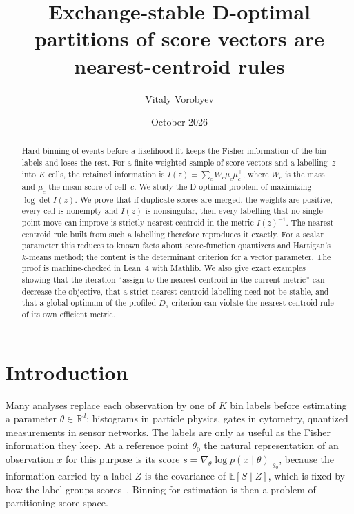 \documentclass[11pt]{amsart}
\title[Exchange-stable D-optimal binning of scores]{Exchange-stable D-optimal partitions of score
vectors are nearest-centroid rules}
\author{Vitaly Vorobyev}
\date{October 2026}
\theoremstyle{definition}
\theoremstyle{remark}
\newcommand{\R}{\mathbb{R}}
\newcommand{\T}{^{\top}}
\newcommand{\Ib}{I(z)}
\begin{document}
\begin{abstract}
Hard binning of events before a likelihood fit keeps the Fisher information of the bin labels
and loses the rest. For a finite weighted sample of score vectors and a labelling~$z$ into
$K$ cells, the retained information is $\Ib=\sum_c W_c\mu_c\mu_c\T$, where $W_c$ is the mass
and $\mu_c$ the mean score of cell~$c$. We study the D-optimal problem of maximizing
$\log\det\Ib$. We prove that if duplicate scores are merged, the weights are positive, every cell
is nonempty and $\Ib$ is nonsingular, then every labelling that no single-point move can
improve is strictly nearest-centroid in the metric $\Ib^{-1}$. The nearest-centroid rule built
from such a labelling therefore reproduces it exactly. For a scalar parameter this reduces to
known facts about score-function quantizers and Hartigan's $k$-means method; the content is the
determinant criterion for a vector parameter. The proof is machine-checked in Lean~4 with
Mathlib. We also give exact examples showing that the iteration ``assign to the nearest centroid
in the current metric'' can decrease the objective, that a strict nearest-centroid labelling need
not be stable, and that a global optimum of the profiled $D_s$ criterion can violate the
nearest-centroid rule of its own efficient metric.
\end{abstract}

\maketitle

\section{Introduction}\label{sec:intro}

Many analyses replace each observation by one of $K$ bin labels before estimating a parameter
$\theta\in\R^d$: histograms in particle physics, gates in cytometry, quantized measurements in
sensor networks. The labels are only as useful as the Fisher information they keep. At a
reference point $\theta_0$ the natural representation of an observation $x$ for this purpose is
its score $s=\nabla_\theta\log p(x\mid\theta)|_{\theta_0}$, because the information carried by a
label $Z$ is the covariance of $\mathbb{E}[S\mid Z]$, which is fixed by how the label groups
scores~\cite{venkitasubramaniam2006,barnes2020}. Binning for estimation is then a problem of partitioning
score space.
\end{document}
